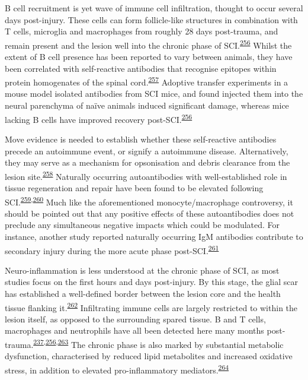 \documentclass[
]{article}
\begin{document}
B cell recruitment is yet wave of immune cell infiltration, thought to occur several days post-injury.
These cells can form follicle-like structures in combination with T cells, microglia and macrophages from roughly 28 days post-trauma, and remain present and the lesion well into the chronic phase of SCI.\textsuperscript{\protect\hyperlink{ref-ankeny_b_2009}{256}}
Whilst the extent of B cell presence has been reported to vary between animals, they have been correlated with self-reactive antibodies that recognise epitopes within protein homogenates of the spinal cord.\textsuperscript{\protect\hyperlink{ref-sun_gammadelta_2017}{257}}
Adoptive transfer experiments in a mouse model isolated antibodies from SCI mice, and found injected them into the neural parenchyma of naïve animals induced significant damage, whereas mice lacking B cells have improved recovery post-SCI.\textsuperscript{\protect\hyperlink{ref-ankeny_b_2009}{256}}

Move evidence is needed to establish whether these self-reactive antibodies precede an autoimmune event, or signify a autoimmune disease.
Alternatively, they may serve as a mechanism for opsonisation and debris clearance from the lesion site.\textsuperscript{\protect\hyperlink{ref-nagele_natural_2013}{258}}
Naturally occurring autoantibodies with well-established role in tissue regeneration and repair have been found to be elevated following SCI.\textsuperscript{\protect\hyperlink{ref-palmers_antibody_2016}{259},\protect\hyperlink{ref-arevalo-martin_elevated_2018}{260}}
Much like the aforementioned monocyte/macrophage controversy, it should be pointed out that any positive effects of these autoantibodies does not preclude any simultaneous negative impacts which could be modulated.
For instance, another study reported naturally occurring IgM antibodies contribute to secondary injury during the more acute phase post-SCI.\textsuperscript{\protect\hyperlink{ref-narang_natural_2017}{261}}

Neuro-inflammation is less understood at the chronic phase of SCI, as most studies focus on the first hours and days post-injury.
By this stage, the glial scar has established a well-defined border between the lesion core and the health tissue flanking it.\textsuperscript{\protect\hyperlink{ref-sofroniew_astrocytes_2010}{262}}
Infiltrating immune cells are largely restricted to within the lesion itself, as opposed to the surrounding spared tissue.
B and T cells, macrophages and neutrophils have all been detected here many months post-trauma.\textsuperscript{\protect\hyperlink{ref-beck_quantitative_2010}{237},\protect\hyperlink{ref-ankeny_b_2009}{256},\protect\hyperlink{ref-pruss_non-resolving_2011}{263}}
The chronic phase is also marked by substantial metabolic dysfunction, characterised by reduced lipid metabolites and increased oxidative stress, in addition to elevated pro-inflammatory mediators.\textsuperscript{\protect\hyperlink{ref-dulin_licofelone_2013}{264}}
\end{document}
